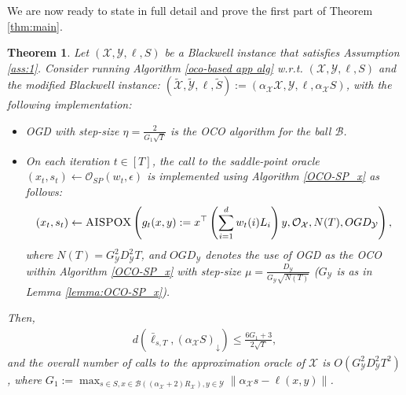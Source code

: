 \documentclass[a4paper,12pt]{article}
\newtheorem{theorem} {Theorem}
\newcommand{\mY}{\mathcal{Y}}
\newcommand{\mX}{\mathcal{X}}
\newcommand{\mB}{\mathcal{B}}
\newcommand{\oraclesp}{\mathcal{O}_{SP}}
\newcommand{\oraclex}{\mathcal{O}_{\mX}}
\begin{document}
We are now ready to state in full detail and prove the first part of Theorem \ref{thm:main}.
\begin{theorem}\label{theorem:app on x} 
Let $(\mX,\mY,\ell,S)$ be a Blackwell instance that satisfies Assumption \ref{ass:1}. Consider running Algorithm \ref{oco-based app  alg} w.r.t. $(\mX,\mY,\ell,S)$ and the modified Blackwell instance:
$(\tilde{\mX}, \tilde{\mY}, \ell, \tilde{S}) := (\alpha_{\mX}\mX, \mY, \ell, \alpha_{\mX}S)$,
with the following implementation:
\begin{itemize}
\item
OGD with step-size $\eta= \frac{2}{G_1\sqrt{T}}$ is the OCO algorithm for the ball $\mB$.
\item
On each iteration $t\in[T]$, the call to the saddle-point oracle $(x_t,s_t)\gets \oraclesp(w_t, \epsilon)$ is implemented using Algorithm \ref{OCO-SP_x} as follows:
\begin{align*}
\left(x_t , s_t \right) \gets \textsc{AISPOX}  \left( g_t(x,y) :=x^\top \left( \sum_{i=1}^d {w_t}(i)L_i \right) y, \oraclex, N(T) , OGD_{\mY}  \right),
\end{align*}
where $N(T)=G_{\mY}^2 D_{\mY}^2 T$, and $OGD_{\mY}$ denotes the use of OGD as the OCO within Algorithm  \ref{OCO-SP_x}  with step-size $\mu= \frac{D_{\mY}}{G_{\mY} \sqrt{N(T)}}$ ($G_{\mY}$ is as in Lemma \ref{lemma:OCO-SP_x}).
\end{itemize}
Then, 
\begin{align}\label{eq:s_t conv x}
d\left(\bar{\ell}_{s,T} , {\left( \alpha_{\mX} S\right)}_{\downarrow}\right)\leq\frac{6G_1+3}{2\sqrt{T}},
\end{align}
and the overall number of calls to the approximation oracle of $\mX$ is $O( G_{\mY}^2 D_{\mY}^2T^2)$, where %
$G_1:=\max_{s\in S, x \in \mB((\alpha_{\mX} +2)R_{\mX}) ,y \in \mY} \|\alpha_{\mX} s -\ell (x,y)\|$.

\end{theorem}
\end{document}
